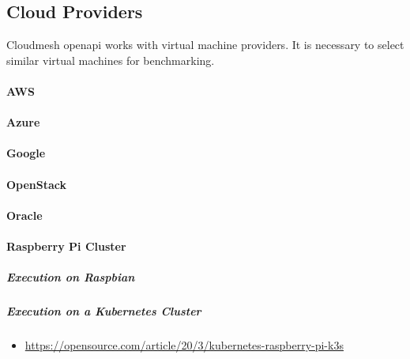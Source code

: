\subsection{Cloud Providers}\label{cloud-providers}

Cloudmesh openapi works with virtual machine providers. It is necessary
to select similar virtual machines for benchmarking.

\hypertarget{aws}{%
\paragraph{AWS}\label{aws}}

\hypertarget{azure}{%
\paragraph{Azure}\label{azure}}

\hypertarget{google}{%
\paragraph{Google}\label{google}}

\hypertarget{openstack}{%
\paragraph{OpenStack}\label{openstack}}

\hypertarget{oracle}{%
\paragraph{Oracle}\label{oracle}}

\hypertarget{raspberry-pi-cluster}{%
\paragraph{Raspberry Pi Cluster}\label{raspberry-pi-cluster}}

\hypertarget{execution-on-raspbian}{%
\subparagraph{Execution on Raspbian}\label{execution-on-raspbian}}

\hypertarget{execution-on-a-kubernetes-cluster}{%
\subparagraph{Execution on a Kubernetes
Cluster}\label{execution-on-a-kubernetes-cluster}}

\begin{itemize}
\tightlist
\item
  \url{https://opensource.com/article/20/3/kubernetes-raspberry-pi-k3s}
\end{itemize}

